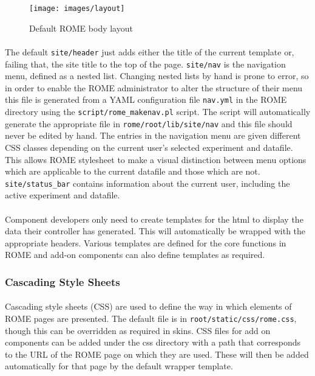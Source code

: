 \begin{figure}
\centering
\caption{Default ROME body layout}\label{fig:layout}
\texttt{[image: images/layout]}
\end{figure}

\paragraph{}
The default \texttt{site/header} just adds either the title of the current template or, failing that, the site title to the top of the page. \texttt{site/nav} is the navigation menu, defined as a nested list. Changing nested lists by hand is prone to error, so in order to enable the ROME administrator to alter the structure of their menu this file is generated from a YAML configuration file \texttt{nav.yml} in the ROME directory using the \texttt{script/rome\_makenav.pl} script. The script will automatically generate the appropriate file in \texttt{rome/root/lib/site/nav} and this file should never be edited by hand. The entries in the navigation menu are given different CSS classes depending on the current user's selected experiment and datafile. This allows ROME stylesheet to make a visual distinction between menu options which are applicable to the current datafile and those which are not. \texttt{site/status\_bar} contains information about the current user, including the active experiment and datafile.

\paragraph{} 
Component developers only need to create templates for the html to display the data their controller has generated. This will automatically be wrapped with the appropriate headers. Various templates are defined for the core functions in ROME and add-on components can also define templates as required. 

\subsubsection{Cascading Style Sheets}
\label{sec:view_css}

\paragraph{}
Cascading style sheets (CSS) are used to define the way in which elements of ROME pages are presented. The default file is in \texttt{root/static/css/rome.css}, though this can be overridden as required in skins. CSS files for add on components can be added under the css directory with a path that corresponds to the URL of the ROME page on which they are used. These will then be added automatically for that page by the default wrapper template.

